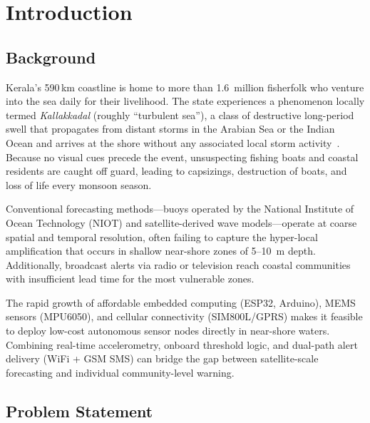 

\chapter{Introduction}

\section{Background}

Kerala's 590\,km coastline is home to more than 1.6~million fisherfolk who venture into
the sea daily for their livelihood.
The state experiences a phenomenon locally termed \textit{Kallakkadal} (roughly
``turbulent sea''), a class of destructive long-period swell that propagates from
distant storms in the Arabian Sea or the Indian Ocean and arrives at the shore without
any associated local storm activity~\cite{kumar2020kallakkadal}.
Because no visual cues precede the event, unsuspecting fishing boats and coastal
residents are caught off guard, leading to capsizings, destruction of boats, and
loss of life every monsoon season.

Conventional forecasting methods---buoys operated by the National Institute of Ocean
Technology (NIOT) and satellite-derived wave models---operate at coarse spatial
and temporal resolution, often failing to capture the hyper-local amplification that
occurs in shallow near-shore zones of 5--10~m depth.
Additionally, broadcast alerts via radio or television reach coastal communities with
insufficient lead time for the most vulnerable zones.

The rapid growth of affordable embedded computing (ESP32, Arduino), MEMS sensors
(MPU6050), and cellular connectivity (SIM800L/GPRS) makes it feasible to deploy
low-cost autonomous sensor nodes directly in near-shore waters.
Combining real-time accelerometry, onboard threshold logic, and dual-path alert
delivery (WiFi + GSM SMS) can bridge the gap between satellite-scale forecasting and
individual community-level warning.

\section{Problem Statement}

